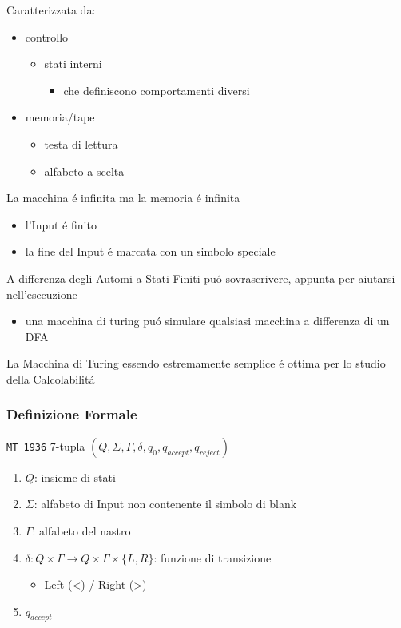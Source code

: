 \documentclass[11pt]{article}
\begin{document}
Caratterizzata da:
\begin{itemize}
\item controllo
\begin{itemize}
\item stati interni
\begin{itemize}
\item che definiscono comportamenti diversi
\end{itemize}
\end{itemize}
\item memoria/tape
\begin{itemize}
\item testa di lettura
\item alfabeto a scelta
\end{itemize}
\end{itemize}
La macchina é infinita ma la memoria é infinita

\begin{itemize}
\item l'Input é finito
\item la fine del Input é marcata con un simbolo speciale
\end{itemize}

A differenza degli Automi a Stati Finiti puó sovrascrivere, appunta per aiutarsi nell'esecuzione
\begin{itemize}
\item una macchina di turing puó simulare qualsiasi macchina a differenza di un DFA
\end{itemize}
La Macchina di Turing essendo estremamente semplice é ottima per lo studio della Calcolabilitá

\subsubsection{Definizione Formale}
\label{sec:org707098c}
\texttt{MT 1936}
7-tupla \((Q,\Sigma,\Gamma,\delta,q_0,q_{accept},q_{reject})\)
\begin{enumerate}
\item \(Q\): insieme di stati
\item \(\Sigma\): alfabeto di Input non contenente il simbolo di blank
\item \(\Gamma\): alfabeto del nastro
\item \(\delta: Q \times \Gamma \rightarrow Q \times \Gamma \times \{L,R\}\): funzione di transizione
\begin{itemize}
\item Left (<) / Right (>)
\end{itemize}
\item \(q_{accept}\)
\end{enumerate}
\end{document}
